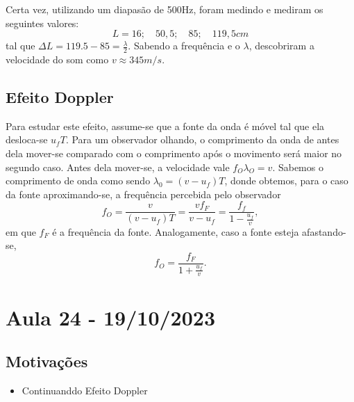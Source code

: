 \documentclass{article}
\begin{document}
  Certa vez, utilizando um diapasão de 500Hz, foram medindo e mediram os seguintes valores: 
    \[
      L = 16;\quad50,5;\quad85;\quad119,5cm
    \]
    tal que \(\Delta L = 119.5 - 85 = \frac{\lambda }{2}\). Sabendo a frequência e o \(\lambda \), descobriram a velocidade do som como \(v\approx 345m/s.\)
\subsection{Efeito Doppler}
  Para estudar este efeito, assume-se que a fonte da onda é móvel tal que ela desloca-se \(u_{f}T\). Para um observador olhando, o comprimento da onda de antes dela
mover-se comparado com o comprimento após o movimento será maior no segundo caso. Antes dela mover-se, a velocidade vale \(f_{O}\lambda_{O} = v\).
Sabemos o comprimento de onda como sendo \(\lambda_{0} = (v-u_{f})T\), donde obtemos, para o caso da fonte aproximando-se, a frequência percebida pelo observador
  \[
    f_{O} = \frac{v}{(v-u_{f})T} = \frac{vf_{F}}{v-u_{f}} = \frac{f_{f}}{1-\frac{u_{f}}{v}},
  \]
em que \(f_{F}\) é a frequência da fonte. Analogamente, caso a fonte esteja afastando-se, 
  \[
    f_{O} = \frac{f_{F}}{1+\frac{u_{f}}{v}}.
  \]
\newpage

\section{Aula 24 - 19/10/2023}
\subsection{Motivações}
\begin{itemize}
  \item Continuanddo Efeito Doppler
\end{itemize}
\end{document}
